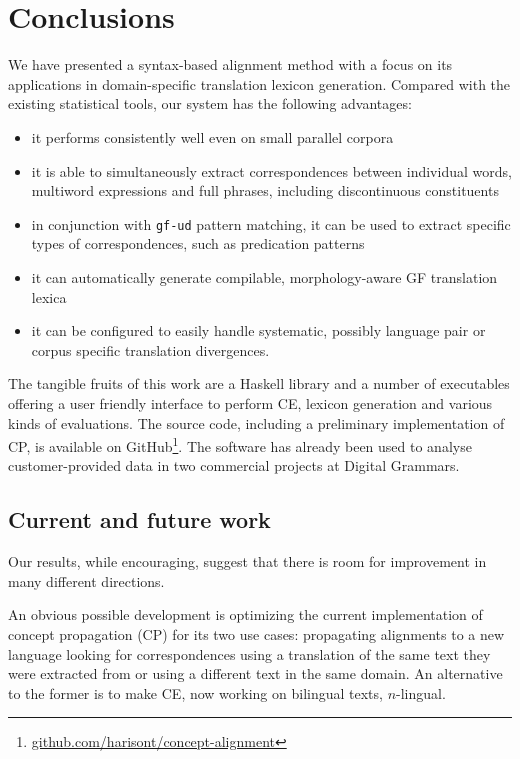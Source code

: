 \documentclass[11pt]{article}
\begin{document}
\section{Conclusions} \label{conclusions}
We have presented a syntax-based alignment method with a focus on its applications in domain-specific translation lexicon generation. Compared with the existing statistical tools, our system has the following advantages:
\begin{itemize} \setlength\itemsep{0.1em}
  \item it performs consistently well even on small parallel corpora
  \item it is able to simultaneously extract correspondences between individual words, multiword expressions and full phrases, including discontinuous constituents
  \item in conjunction with \texttt{gf-ud} pattern matching, it can be used to extract specific types of correspondences, such as predication patterns  
  \item it can automatically generate compilable, morphology-aware GF translation lexica
  \item it can be configured to easily handle systematic, possibly language pair or corpus specific translation divergences.
\end{itemize}

The tangible fruits of this work are a Haskell library and a number of executables offering a user friendly interface to perform CE, lexicon generation and various kinds of evaluations. 
The source code, including a preliminary implementation of CP, is available on GitHub\footnote{\url{github.com/harisont/concept-alignment}}. 
The software has already been used to analyse customer-provided data in two commercial projects at Digital Grammars. 

\subsection{Current and future work}
Our results, while encouraging, suggest that there is room for improvement in many different directions.

An obvious possible development is optimizing the current implementation of concept propagation (CP) for its two use cases: propagating alignments to a new language looking for correspondences using a translation of the same text they were extracted from or using a different text in the same domain.
An alternative to the former is to make CE, now working on bilingual texts, $n$-lingual.
\end{document}
